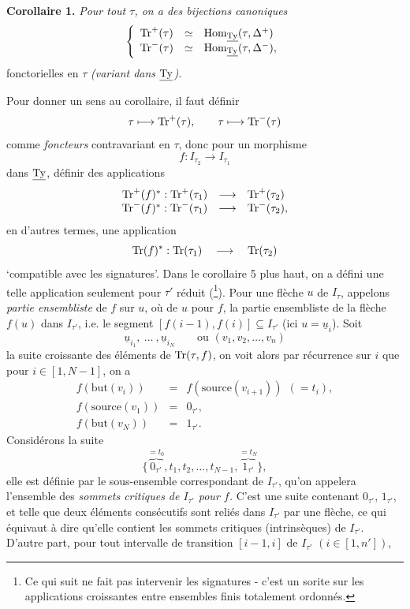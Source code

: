 \textbf{Corollaire 1.} \textit{Pour tout $\tau$, on a des bijections canoniques}
\[
\left\{
\begin{array}{lcl}
\mathrm{Tr}^+(\tau) & \simeq & \mathrm{Hom}_{\underline{\mathrm{Ty}}}(\tau, \Delta^+) \\
\mathrm{Tr}^-(\tau) & \simeq & \mathrm{Hom}_{\underline{\mathrm{Ty}}}(\tau, \Delta^-),
\end{array}
\right.
\]
fonctorielles en $\tau$ \textit{(variant dans} $\underline{\mathrm{Ty}}$\textit{).}


Pour donner un sens au corollaire, il faut définir
\[
\tau \longmapsto \mathrm{Tr}^+(\tau), \qquad \tau \longmapsto \mathrm{Tr}^-(\tau)
\]
comme \textit{foncteurs} contravariant en $\tau$, donc pour un morphisme
\[
f : I_{\tau_2} \longrightarrow I_{\tau_1}
\]
dans $\underline{\mathrm{Ty}}$, définir des applications
\[
\begin{array}{rcl}
\mathrm{Tr}^+(f)^* : \mathrm{Tr}^+(\tau_1) & \longrightarrow & \mathrm{Tr}^+(\tau_2) \\
\mathrm{Tr}^-(f)^* : \mathrm{Tr}^-(\tau_1) & \longrightarrow & \mathrm{Tr}^-(\tau_2),
\end{array}
\]
en d'autres termes, une application
\[
\mathrm{Tr}(f)^* : \mathrm{Tr}(\tau_1) \quad \longrightarrow \quad \mathrm{Tr}(\tau_2)
\]
‘compatible avec les signatures’. Dans le corollaire 5 plus haut, on a défini une telle application seulement pour $\tau'$ réduit (\footnote[12]{Ce qui suit ne fait pas intervenir les signatures - c'est un sorite sur les applications croissantes entre ensembles finis totalement ordonnés.}). Pour une flèche $u$ de $I_\tau$, appelons \textit{partie ensembliste} de $f$ sur $u$, où de $u$ pour $f$, la partie ensembliste de la flèche $f(u)$ dans $I_{\tau'}$, i.e. le segment $[f(i-1), f(i)] \subseteq I_{\tau'}$ (ici $u = \underline{u}_i$). Soit %
\[
\underline{u}_{i_1},\ \dots\ ,\underline{u}_{i_N} \qquad \text{ou } (v_1, v_2, \dots, v_n)
\] %
la suite croissante des éléments de $\mathrm{Tr}(\tau, f)$, on voit alors par récurrence sur $i$ que pour $i \in [1, N-1]$, on a
\[
\begin{array}{rcl}
f(\mathrm{but}(v_i)) & = & f(\mathrm{source}(v_{i+1}))\ \ (= t_i), \\
f(\mathrm{source}(v_1)) & = & 0_{\tau'}, \\
f(\mathrm{but}(v_N)) & = & 1_{\tau'}.
\end{array}
\]
Considérons la suite
\[
\{\overbrace{0_{\tau'}}^{= t_0}, t_1, t_2, \dots, t_{N-1}, \overbrace{1_{\tau'}}^{= t_N}\},
\]
elle est définie par le sous-ensemble correspondant de $I_{\tau'}$, qu'on appelera l'ensemble des \textit{sommets critiques de $I_{\tau'}$ pour $f$.} C'est une suite contenant $0_{\tau'}$, $1_{\tau'}$, et telle que deux éléments consécutifs sont reliés dans $I_{\tau'}$ par une flèche, ce qui équivaut à dire qu'elle contient les sommets critiques (intrinsèques) de $I_{\tau'}$. D'autre part, pour tout intervalle de transition $[i-1, i]$ de $I_{\tau'}$ $(i \in [1, n'])$, %
